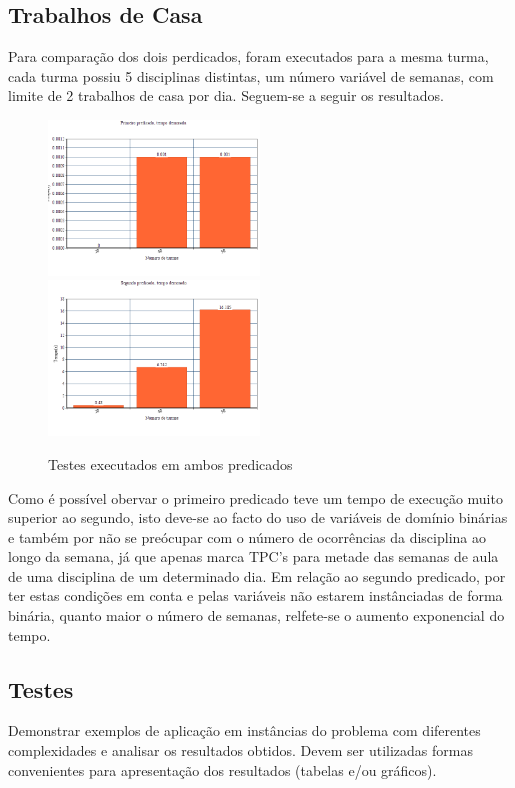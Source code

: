 \documentclass{llncs}
\begin{document}
\subsection{ Trabalhos de Casa}

Para comparação dos dois perdicados, foram executados para a mesma turma, cada turma possiu 5 disciplinas distintas, um número variável de semanas, com limite de 2 trabalhos de casa por dia. Seguem-se a seguir os resultados.

\begin{figure}
\includegraphics[width=0.5\textwidth]{g1}
\includegraphics[width=0.5\textwidth]{g2}
\caption{Testes executados em ambos predicados}
\end{figure}

Como é possível obervar o primeiro predicado teve um tempo de execução muito superior ao segundo, isto deve-se ao facto do uso de variáveis de domínio binárias e também por não se preócupar com o número de ocorrências da disciplina ao longo da semana, já que apenas marca TPC's para metade das semanas de aula de uma disciplina de um determinado dia.
Em relação ao segundo predicado, por ter estas condições em conta e pelas variáveis não estarem instânciadas de forma binária, quanto maior o número de semanas, relfete-se o aumento exponencial do tempo.


\subsection{ Testes}

Demonstrar exemplos de aplicação em instâncias do problema com
diferentes complexidades e analisar os resultados obtidos. Devem ser utilizadas formas
convenientes para apresentação dos resultados (tabelas e/ou gráficos).
\end{document}
